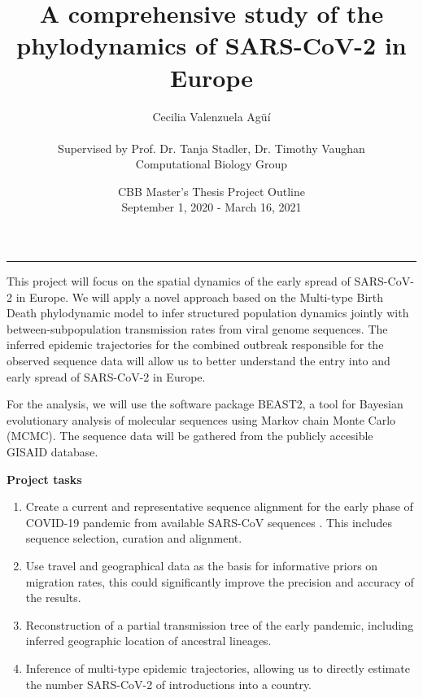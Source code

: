 \documentclass{article}
\title{A comprehensive study of the phylodynamics of SARS-CoV-2 in Europe }
\author{Cecilia Valenzuela Agüí \\  \\  Supervised by Prof. Dr. Tanja Stadler, Dr. Timothy Vaughan \\ Computational Biology Group }
\date{CBB Master's Thesis Project Outline \\ September 1, 2020 - March 16, 2021 }
\begin{document}
\maketitle
\begin{flushleft}
\rule{\textwidth}{0.5pt}

\vspace{10mm}

This project will focus on the spatial dynamics of the early spread of SARS-CoV-2 in Europe. We will apply a novel approach based on the Multi-type Birth Death phylodynamic model to infer structured population dynamics jointly with between-subpopulation transmission rates from viral genome sequences. The inferred epidemic trajectories for the combined outbreak responsible for the observed sequence data will allow us to better understand the entry into and early spread of SARS-CoV-2 in Europe.

\vspace{4mm}

For the analysis, we will use the software package BEAST2, a tool for Bayesian evolutionary analysis of molecular sequences using Markov chain Monte Carlo (MCMC). The sequence data will be gathered from the publicly accesible GISAID database. 

\vspace{4mm}

\textbf{Project tasks}

\begin{enumerate}
\item Create a current and representative sequence alignment for the early phase of COVID-19 pandemic from available SARS-CoV sequences . This includes sequence selection, curation and alignment.
\item Use travel and geographical data as the basis for informative priors on migration rates, this could significantly improve the precision and accuracy of the results.
\item Reconstruction of a partial transmission tree of the early pandemic, including inferred geographic location of ancestral lineages.
\item Inference of multi-type epidemic trajectories, allowing us to directly estimate the number SARS-CoV-2 of introductions into a country.
\end{enumerate}

\end{flushleft}
\end{document}
